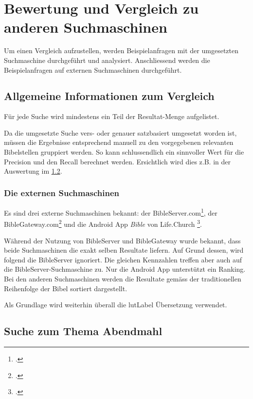 \chapter{Bewertung und Vergleich zu anderen Suchmaschinen}
 \label{sec:compareSearches}
Um einen Vergleich aufzustellen, werden Beispielanfragen mit der umgesetzten Suchmaschine durchgeführt und analysiert.
Anschliessend werden die Beispielanfragen auf externen Suchmaschinen durchgeführt.

\section{Allgemeine Informationen zum Vergleich}
Für jede Suche wird mindestens ein Teil der Resultat-Menge aufgelistet.

Da die umgesetzte Suche vers- oder genauer satzbasiert umgesetzt worden ist, müssen die Ergebnisse entsprechend manuell zu den vorgegebenen relevanten Bibelstellen gruppiert werden.
So kann schlussendlich ein sinnvoller Wert für die Precision und den Recall berechnet werden.
Ersichtlich wird dies z.B. in der Auswertung im \cref{sec:index_abendmahl}.


\subsection{Die externen Suchmaschinen}
Es sind drei externe Suchmaschinen bekannt: der BibleServer.com\footcite{BibleServer_Die_Bibel_fr_alle_2016-05-30}, der BibleGateway.com\footcite{BibleGateway_2016-05-30} und die Android App \textit{Bible} von Life.Church \footcite{Bible_Android_Apps_on_Google_Play_2016-05-30}.

Während der Nutzung von BibleServer und BibleGateway wurde bekannt, dass beide Suchmaschinen die exakt selben Resultate liefern.
Auf Grund dessen, wird folgend die BibleServer ignoriert. Die gleichen Kennzahlen treffen aber auch auf die BibleServer-Suchmaschine zu.
Nur die Android App unterstützt ein Ranking. Bei den anderen Suchmaschinen werden die Resultate gemäss der traditionellen Reihenfolge der Bibel sortiert dargestellt.

Als Grundlage wird weiterhin überall die \gls{lutLabel} Übersetzung verwendet.



\newpage
\section{Suche zum Thema Abendmahl}
\label{sec:index_abendmahl}

